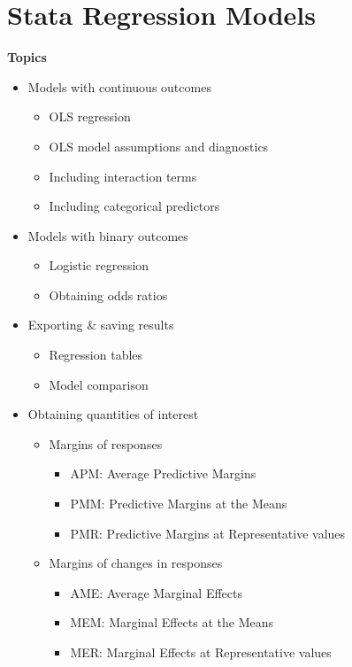 \documentclass[
]{book}
\providecommand{\tightlist}{%
  \setlength{\itemsep}{0pt}\setlength{\parskip}{0pt}}
\begin{document}
\hypertarget{stata-regression-models}{%
\chapter{Stata Regression Models}\label{stata-regression-models}}

\textbf{Topics}

\begin{itemize}
\tightlist
\item
  Models with continuous outcomes

  \begin{itemize}
  \tightlist
  \item
    OLS regression
  \item
    OLS model assumptions and diagnostics
  \item
    Including interaction terms
  \item
    Including categorical predictors
  \end{itemize}
\item
  Models with binary outcomes

  \begin{itemize}
  \tightlist
  \item
    Logistic regression
  \item
    Obtaining odds ratios
  \end{itemize}
\item
  Exporting \& saving results

  \begin{itemize}
  \tightlist
  \item
    Regression tables
  \item
    Model comparison
  \end{itemize}
\item
  Obtaining quantities of interest

  \begin{itemize}
  \tightlist
  \item
    Margins of responses

    \begin{itemize}
    \tightlist
    \item
      APM: Average Predictive Margins
    \item
      PMM: Predictive Margins at the Means
    \item
      PMR: Predictive Margins at Representative values
    \end{itemize}
  \item
    Margins of changes in responses

    \begin{itemize}
    \tightlist
    \item
      AME: Average Marginal Effects
    \item
      MEM: Marginal Effects at the Means
    \item
      MER: Marginal Effects at Representative values
    \end{itemize}
  \end{itemize}
\end{itemize}
\end{document}
